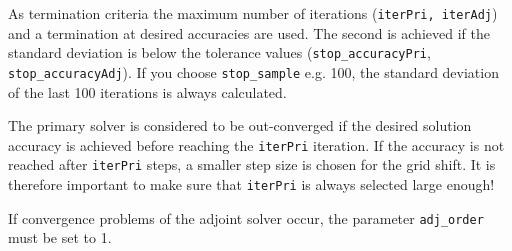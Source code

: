 \documentclass[oneside]{article}
\numberwithin{equation}{section}
\numberwithin{figure}{section}
\numberwithin{figure}{section}
\begin{document}
As termination criteria the maximum number of iterations (\texttt{iterPri, iterAdj}) and a termination at desired accuracies are used. The second is achieved if the standard deviation is below the tolerance values (\verb|stop_accuracyPri|, \verb|stop_accuracyAdj|). If you choose \verb|stop_sample| e.g. 100, the standard deviation of the last 100 iterations is always calculated.

The primary solver is considered to be out-converged if the desired solution accuracy is achieved before reaching the \texttt{iterPri} iteration. If the accuracy is not reached after \texttt{iterPri} steps, a smaller step size is chosen for the grid shift. It is therefore important to make sure that \texttt{iterPri} is always selected large enough!

If convergence problems of the adjoint solver occur, the parameter \verb|adj_order| must be set to 1.
\end{document}
